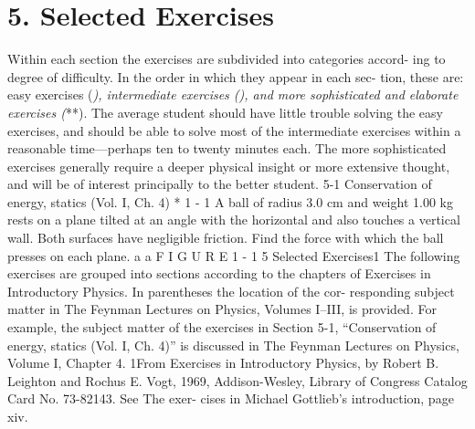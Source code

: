 \documentclass[10pt,oneside]{article}
\begin{document}
\section*{5. Selected Exercises}
\label{tips-sec-13-5-selected-exercises}
Within each section the exercises are subdivided into categories accord- ing to degree of difficulty. In the order in which they appear in each sec- tion, these are: easy exercises (\emph{), intermediate exercises (}\emph{), and more sophisticated and elaborate exercises (}**). The average student should have little trouble solving the easy exercises, and should be able to solve most of the intermediate exercises within a reasonable time---perhaps ten to twenty minutes each. The more sophisticated exercises generally require a deeper physical insight or more extensive thought, and will be of interest principally to the better student. 5-1 Conservation of energy, statics (Vol. I, Ch. 4) * 1 - 1 A ball of radius 3.0 cm and weight 1.00 kg rests on a plane tilted at an angle with the horizontal and also touches a vertical wall. Both surfaces have negligible friction. Find the force with which the ball presses on each plane. a a F I G U R E  1 - 1 5 Selected Exercises1 The following exercises are grouped into sections according to the chapters of Exercises in Introductory Physics. In parentheses the location of the cor- responding subject matter in The Feynman Lectures on Physics, Volumes I–III, is provided. For example, the subject matter of the exercises in Section 5-1, “Conservation of energy, statics (Vol. I, Ch. 4)” is discussed in The Feynman Lectures on Physics, Volume I, Chapter 4. 1From Exercises in Introductory Physics, by Robert B. Leighton and Rochus E. Vogt, 1969, Addison-Wesley, Library of Congress Catalog Card No. 73-82143. See The exer- cises in Michael Gottlieb’s introduction, page xiv.\par
\end{document}
